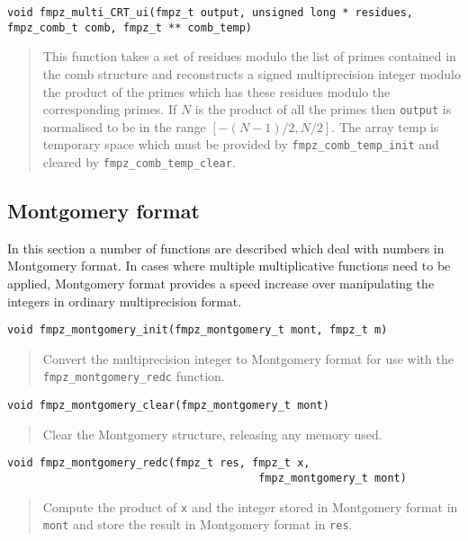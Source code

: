 \documentclass[a4paper,10pt]{article}
\newcommand{\code}{\lstinline}
\begin{document}
\begin{lstlisting}
void fmpz_multi_CRT_ui(fmpz_t output, unsigned long * residues, fmpz_comb_t comb, fmpz_t ** comb_temp)
\end{lstlisting}
\begin{quote}
This function takes a set of residues modulo the list of primes contained in the comb structure and reconstructs a signed multiprecision integer modulo the product of the primes which has these residues modulo the corresponding primes. If $N$ is the product of all the primes then \code{output} is normalised to be in the range $[-(N-1)/2, N/2]$. The array temp is temporary space which must be provided by \code{fmpz_comb_temp_init} and cleared by \code{fmpz_comb_temp_clear}.
\end{quote}

\subsection{Montgomery format}

In this section a number of functions are described which deal with numbers in Montgomery format. In cases where multiple multiplicative functions need to be applied, Montgomery format provides a speed increase over manipulating the integers in ordinary multiprecision format.

\begin{lstlisting}
void fmpz_montgomery_init(fmpz_montgomery_t mont, fmpz_t m) 
\end{lstlisting}
\begin{quote}
Convert the multiprecision integer to Montgomery format for use with the \code{fmpz_montgomery_redc} function.
\end{quote}

\begin{lstlisting}
void fmpz_montgomery_clear(fmpz_montgomery_t mont) 
\end{lstlisting}
\begin{quote}
Clear the Montgomery structure, releasing any memory used.
\end{quote}

\begin{lstlisting}
void fmpz_montgomery_redc(fmpz_t res, fmpz_t x, 
                                       fmpz_montgomery_t mont) 
\end{lstlisting}
\begin{quote}
Compute the product of \code{x} and the integer stored in Montgomery format in \code{mont} and store the result in Montgomery format in \code{res}.
\end{quote}
\end{document}
